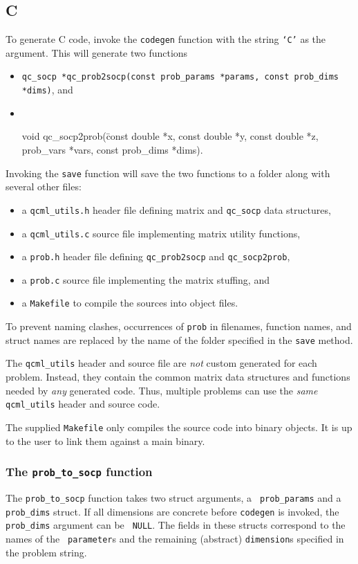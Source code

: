 \documentclass[11pt]{article}
\begin{document}
\subsection{C}
To generate C code, invoke the {\tt codegen} function with the string
{\tt `C'} as the argument. This will generate two functions
\begin{itemize}
\item {\tt qc\_socp *qc\_prob2socp(const prob\_params *params, const prob\_dims *dims)}, and
\item
{\tt
\begin{tabbing}
void qc\_socp2prob(\=const double *x, const double *y, const double *z,\\
\> prob\_vars *vars, const prob\_dims *dims).
\end{tabbing}
}
\end{itemize}
Invoking the {\tt save} function will save the two functions to a folder along
with several other files:
\begin{itemize}
  \item a {\tt qcml\_utils.h} header file defining matrix and {\tt qc\_socp} data structures,
  \item a {\tt qcml\_utils.c} source file implementing matrix utility functions,
  \item a {\tt prob.h} header file defining {\tt qc\_prob2socp} and {\tt qc\_socp2prob},
  \item a {\tt prob.c} source file implementing the matrix stuffing, and
  \item a {\tt Makefile} to compile the sources into object files.
\end{itemize}
To prevent naming clashes, occurrences of {\tt prob} in filenames, function
names, and struct names are replaced by the name of the folder specified in
the {\tt save} method.

The {\tt qcml\_utils} header and source file are \emph{not} custom generated
for each problem. Instead, they contain the common matrix data structures and
functions needed by \emph{any} generated code. Thus, multiple problems can
use the \emph{same} {\tt qcml\_utils} header and source code.

The supplied {\tt Makefile} only compiles the source code into binary objects.
It is up to the user to link them against a main binary.


\subsubsection{The {\tt prob\_to\_socp} function}
The {\tt prob\_to\_socp} function takes two struct arguments, a {\tt
prob\_params} and a {\tt prob\_dims} struct. If all dimensions are concrete
before {\tt codegen} is invoked, the {\tt prob\_dims} argument can be {\tt
NULL}. The fields in these structs correspond to the names of the {\tt
parameter}s and the remaining (abstract) {\tt dimension}s specified in the
problem string.
\end{document}
